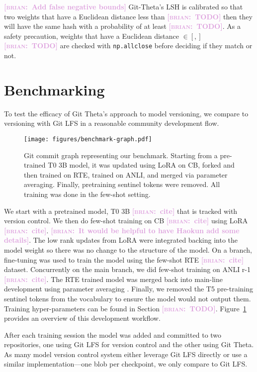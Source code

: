 \documentclass[nohyperref]{article}
\def\code#1{\texttt{#1}}
\theoremstyle{plain}
\theoremstyle{definition}
\theoremstyle{remark}
\newcommand{\brian}[1]{\textcolor{Plum}{\bf\small [\textsc{brian}:~#1]}}
\begin{document}
\brian{Add false negative bounds}
Git-Theta's LSH is calibrated so that two weights that have a Euclidean distance less than \brian{TODO} then they will have the same hash with a probability of at least \brian{TODO}. As a safety precaution, weights that have a Euclidean distance $\in [, ]$ \brian{TODO} are checked with \code{np.allclose} before deciding if they match or not.

\section{Benchmarking} \label{sec:benchmarking}

To test the efficacy of Git Theta's approach to model versioning, we compare to versioning with Git LFS in a reasonable community development flow.

\begin{figure}[ht]
\vskip 0.2in
\begin{center}
\centerline{\texttt{[image: figures/benchmark-graph.pdf]}}
\caption{Git commit graph representing our benchmark. Starting from a pre-trained T0 3B model, it was updated using LoRA on CB, forked and then trained on RTE, trained on ANLI, and merged via parameter averaging. Finally, pretraining sentinel tokens were removed. All training was done in the few-shot setting.}
\label{fig:commit-graph}
\end{center}
\vskip -0.2in
\end{figure}

We start with a pretrained model, T0 3B \brian{cite} that is tracked with version control. We then do few-shot training on CB \brian{cite} using LoRA \brian{cite}. \brian{It would be helpful to have Haokun add some details}. The low rank updates from LoRA were integrated backing into the model weight so there was no change to the structure of the model. On a branch, fine-tuning was used to train the model using the few-shot RTE \brian{cite} dataset. Concurrently on the main branch, we did few-shot training on ANLI r-1 \brian{cite}. The RTE trained model was merged back into main-line development using parameter averaging \cite{}. Finally, we removed the T5 \cite{} pre-training sentinel tokens from the vocabulary to ensure the model would not output them. Training hyper-parameters can be found in Section \brian{TODO}. Figure~\ref{fig:commit-graph} provides an overview of this development workflow.

After each training session the model was added and committed to two repositories, one using Git LFS for version control and the other using Git Theta. As many model version control system either leverage Git LFS directly or use a similar implementation---one blob per checkpoint, we only compare to Git LFS.
\end{document}
